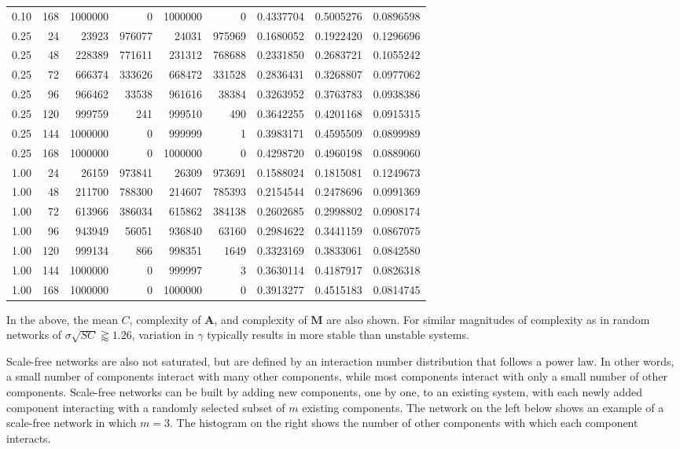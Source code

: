 \documentclass[]{article}
\begin{document}
\begin{longtable}[]{@{}rrrrrrrrr@{}}
0.10 & 168 & 1000000 & 0 & 1000000 & 0 & 0.4337704 & 0.5005276 &
0.0896598\tabularnewline
0.25 & 24 & 23923 & 976077 & 24031 & 975969 & 0.1680052 & 0.1922420 &
0.1296696\tabularnewline
0.25 & 48 & 228389 & 771611 & 231312 & 768688 & 0.2331850 & 0.2683721 &
0.1055242\tabularnewline
0.25 & 72 & 666374 & 333626 & 668472 & 331528 & 0.2836431 & 0.3268807 &
0.0977062\tabularnewline
0.25 & 96 & 966462 & 33538 & 961616 & 38384 & 0.3263952 & 0.3763783 &
0.0938386\tabularnewline
0.25 & 120 & 999759 & 241 & 999510 & 490 & 0.3642255 & 0.4201168 &
0.0915315\tabularnewline
0.25 & 144 & 1000000 & 0 & 999999 & 1 & 0.3983171 & 0.4595509 &
0.0899989\tabularnewline
0.25 & 168 & 1000000 & 0 & 1000000 & 0 & 0.4298720 & 0.4960198 &
0.0889060\tabularnewline
1.00 & 24 & 26159 & 973841 & 26309 & 973691 & 0.1588024 & 0.1815081 &
0.1249673\tabularnewline
1.00 & 48 & 211700 & 788300 & 214607 & 785393 & 0.2154544 & 0.2478696 &
0.0991369\tabularnewline
1.00 & 72 & 613966 & 386034 & 615862 & 384138 & 0.2602685 & 0.2998802 &
0.0908174\tabularnewline
1.00 & 96 & 943949 & 56051 & 936840 & 63160 & 0.2984622 & 0.3441159 &
0.0867075\tabularnewline
1.00 & 120 & 999134 & 866 & 998351 & 1649 & 0.3323169 & 0.3833061 &
0.0842580\tabularnewline
1.00 & 144 & 1000000 & 0 & 999997 & 3 & 0.3630114 & 0.4187917 &
0.0826318\tabularnewline
1.00 & 168 & 1000000 & 0 & 1000000 & 0 & 0.3913277 & 0.4515183 &
0.0814745\tabularnewline
\bottomrule
\end{longtable}

In the above, the mean \(C\), complexity of \(\mathbf{A}\), and
complexity of \(\mathbf{M}\) are also shown. For similar magnitudes of
complexity as in random networks of \(\sigma\sqrt{SC} \gtrapprox 1.26\),
variation in \(\gamma\) typically results in more stable than unstable
systems.

Scale-free networks are also not saturated, but are defined by an
interaction number distribution that follows a power law. In other
words, a small number of components interact with many other components,
while most components interact with only a small number of other
components. Scale-free networks can be built by adding new components,
one by one, to an existing system, with each newly added component
interacting with a randomly selected subset of \(m\) existing
components. The network on the left below shows an example of a
scale-free network in which \(m = 3\). The histogram on the right shows
the number of other components with which each component interacts.
\end{document}
